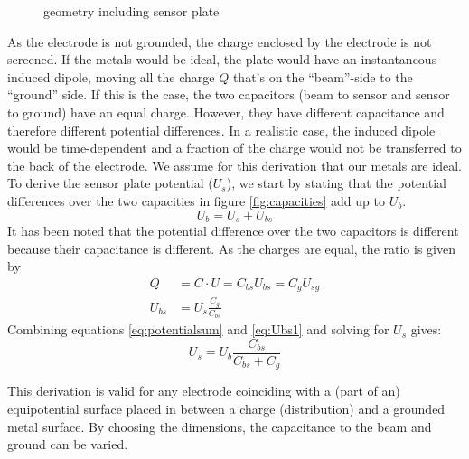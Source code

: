 \begin{figure}[ht]
\centering

\caption{geometry including sensor plate}
\label{fig:geofrontview}
\end{figure}

As the electrode is not grounded, the charge enclosed by the electrode is not screened. If the metals would be ideal, the plate would have an instantaneous induced dipole, moving all the charge $Q$ that's on the ``beam''-side to the ``ground'' side. If this is the case, the two capacitors (beam to sensor and sensor to ground) have an equal charge. However, they have different capacitance and therefore different potential differences. 
In a realistic case, the induced dipole would be time-dependent and a fraction of the charge would not be transferred to the back of the electrode. We assume for this derivation that our metals are ideal. 
To derive the sensor plate potential ($U_s$), we start by stating that the potential differences over the two capacities in figure \ref{fig:capacities} add up to $U_b$.
\begin{equation}
U_b = U_s + U_{bs}
\label{eq:potentialsum}
\end{equation}
It has been noted that the potential difference over the two capacitors is different because their capacitance is different. As the charges are equal, the ratio is given by
\begin{align}
Q &= C\cdot U = C_{bs} U_{bs} = C_g U_{sg} \nonumber \\
U_{bs} &= U_s\frac{C_g}{C_{bs}} \label{eq:Ubs1}
\end{align}
Combining equations \ref{eq:potentialsum} and \ref{eq:Ubs1} and solving for $U_s$ gives:
\begin{equation}
U_s = U_b \frac{C_{bs}}{C_{bs}+C_g}
\label{eq:vplatec}
\end{equation}

This derivation is valid for any electrode coinciding with a (part of an) equipotential surface placed in between a charge (distribution) and a grounded metal surface. By choosing the dimensions, the capacitance to the beam and ground can be varied. 

